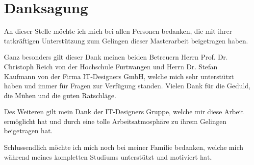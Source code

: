
\chapter*{Danksagung} %

An dieser Stelle möchte ich mich bei allen Personen bedanken, die mit ihrer tatkräftigen Unterstützung zum
Gelingen dieser Masterarbeit beigetragen haben.

Ganz besonders gilt dieser Dank meinen beiden Betreuern Herrn Prof. Dr. Christoph Reich von
der Hochschule Furtwangen und Herrn Dr. Stefan Kaufmann von der Firma IT-Designers GmbH, welche
mich sehr unterstützt haben und immer für Fragen zur Verfügung standen.
Vielen Dank für die Geduld, die Mühen und die guten Ratschläge.

Des Weiteren gilt mein Dank der IT-Designers Gruppe, welche mir diese Arbeit ermöglicht hat und durch eine
tolle Arbeitsatmosphäre zu ihrem Gelingen beigetragen hat.


Schlussendlich möchte ich mich noch bei meiner Familie bedanken, welche mich während meines
kompletten Studiums unterstützt und motiviert hat.